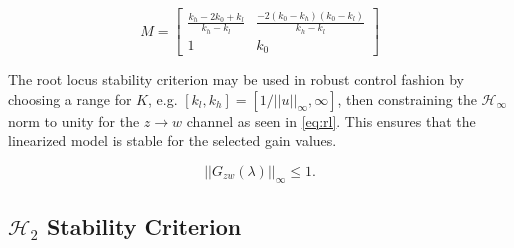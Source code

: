 \begin{equation}
	M = 
	\begin{bmatrix}
		\frac{k_h - 2k_0 + k_l}{k_h - k_l} & \frac{-2(k_0 - k_h)(k_0 - k_l)}{k_h - k_l} \\
		1 & k_0
	\end{bmatrix}  \label{eq:lft-range}
\end{equation}

The root locus stability criterion may be used in robust control fashion by choosing a range for $K$, e.g. $[k_l, k_h] = [1/||u||_\infty, \infty]$, then constraining the $\mathcal{H}_\infty$ norm to unity for the $z \rightarrow w$ channel as seen in \autoref{eq:rl}. This ensures that the linearized model is stable for the selected gain values.
 
 \begin{equation}
 	||G_{zw}(\lambda)||_\infty \leq 1. \label{eq:rl}
 \end{equation}
 
 \subsection{$\mathcal{H}_2$ Stability Criterion}
 \label{sec:stab-h2}
 
